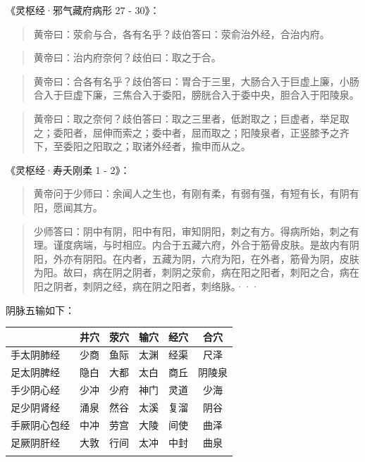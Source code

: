 \documentclass[
]{book}
\newcounter{none} %
\begin{document}
《灵枢经·邪气藏府病形 27 - 30》：

\begin{quote}
黄帝曰：荥俞与合，各有名乎？歧伯答曰：荥俞治外经，合治内府。
\end{quote}

\begin{quote}
黄帝曰：治内府奈何？歧伯曰：取之于合。
\end{quote}

\begin{quote}
黄帝曰：合各有名乎？歧伯答曰：胃合于三里，大肠合入于巨虚上廉，小肠合入于巨虚下廉，三焦合入于委阳，膀胱合入于委中央，胆合入于阳陵泉。
\end{quote}

\begin{quote}
黄帝曰：取之奈何？歧伯答曰：取之三里者，低跗取之；巨虚者，举足取之；委阳者，屈伸而索之；委中者，屈而取之；阳陵泉者，正竖膝予之齐下，至委阳之阳取之；取诸外经者，揄申而从之。
\end{quote}

《灵枢经·寿夭刚柔 1 - 2》：

\begin{quote}
黄帝问于少师曰：余闻人之生也，有刚有柔，有弱有强，有短有长，有阴有阳，愿闻其方。
\end{quote}

\begin{quote}
少师答曰：阴中有阴，阳中有阳，审知阴阳，刺之有方。得病所始，刺之有理。谨度病端，与时相应。内合于五藏六府，外合于筋骨皮肤。是故内有阴阳，外亦有阴阳。在内者，五藏为阴，六府为阳，在外者，筋骨为阴，皮肤为阳。故曰，病在阴之阴者，刺阴之荥俞，病在阳之阳者，刺阳之合，病在阳之阴者，刺阴之经，病在阴之阳者，刺络脉。···
\end{quote}

阴脉五输如下：

{\def\LTcaptype{none} %
\begin{longtable}[]{@{}lccccc@{}}
\toprule\noalign{}
& 井穴 & 荥穴 & 输穴 & 经穴 & 合穴 \\
\midrule\noalign{}
\endhead
\bottomrule\noalign{}
\endlastfoot
手太阴肺经 & 少商 & 鱼际 & 太渊 & 经渠 & 尺泽 \\
足太阴脾经 & 隐白 & 大都 & 太白 & 商丘 & 阴陵泉 \\
手少阴心经 & 少冲 & 少府 & 神门 & 灵道 & 少海 \\
足少阴肾经 & 涌泉 & 然谷 & 太溪 & 复溜 & 阴谷 \\
手厥阴心包经 & 中冲 & 劳宫 & 大陵 & 间使 & 曲泽 \\
足厥阴肝经 & 大敦 & 行间 & 太冲 & 中封 & 曲泉 \\
& & & & & \\
\end{longtable}
}
\end{document}
